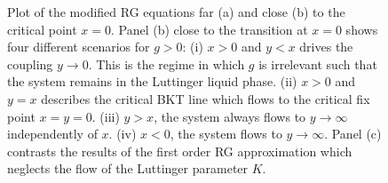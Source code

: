 \begin{figure}
    \caption{Plot of the modified RG equations far (a) and close (b) to the critical point $x=0$. Panel (b) close to the transition at $x=0$ shows four different scenarios for $g>0$: (i) $x>0$ and $y<x$ drives the coupling $y\rightarrow0$. This is the regime in which $g$ is irrelevant such that the system remains in the Luttinger liquid phase. (ii) $x>0$ and $y=x$ describes the critical BKT line which flows to the critical fix point $x=y=0$. (iii) $y>x$, the system always flows to $y\rightarrow\infty$ independently of $x$. (iv) $x<0$, the system flows to $y\rightarrow\infty$. Panel (c) contrasts the results of the first order RG approximation which neglects the flow of the Luttinger parameter $K$.}
    \label{fig:bkt_flow_equations}
\end{figure}


